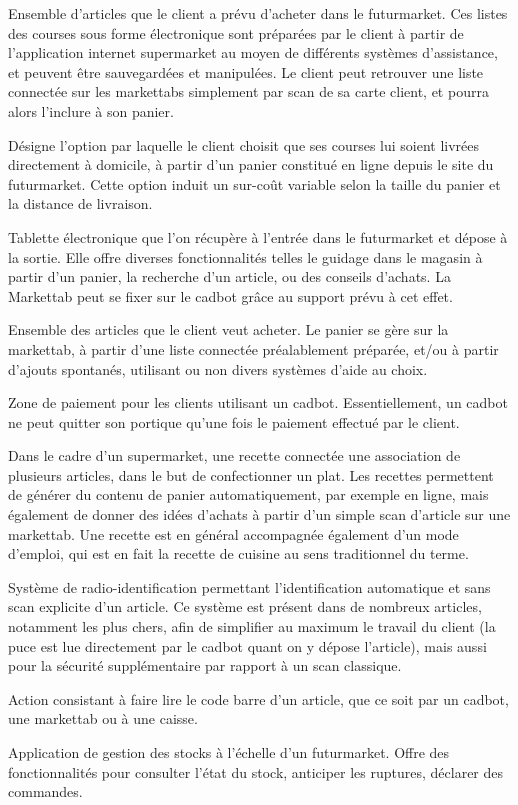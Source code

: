 Ensemble d'articles que le client a prévu d'acheter dans le futurmarket.
Ces listes des courses sous forme électronique sont préparées par le client à partir de l'application internet supermarket au moyen de différents systèmes d'assistance, et peuvent être sauvegardées et manipulées. 
Le client peut retrouver une liste connectée sur les markettabs simplement par scan de sa carte client, et pourra alors l'inclure à son panier.

Désigne l'option par laquelle le client choisit que ses courses lui soient livrées directement à domicile, à partir d'un panier constitué en ligne depuis le site du futurmarket.
Cette option induit un sur-coût variable selon la taille du panier et la distance de livraison.

Tablette électronique que l'on récupère à l'entrée dans le futurmarket et dépose à la sortie.
Elle offre diverses fonctionnalités telles le guidage dans le magasin à partir d'un panier, la recherche d'un article, ou des conseils d'achats.
La Markettab peut se fixer sur le cadbot grâce au support prévu à cet effet.

Ensemble des articles que le client veut acheter.
Le panier se gère sur la markettab, à partir d'une liste connectée préalablement préparée, et/ou à partir d'ajouts spontanés, utilisant ou non divers systèmes d'aide au choix.

Zone de paiement pour les clients utilisant un cadbot.
Essentiellement, un cadbot ne peut quitter son portique qu'une fois le paiement effectué par le client.

Dans le cadre d'un supermarket, une recette connectée une association de plusieurs articles, dans le but de confectionner un plat. 
Les recettes permettent de générer du contenu de panier automatiquement, par exemple en ligne, mais également de donner des idées d'achats à partir d'un simple scan d'article sur une markettab.
Une recette est en général accompagnée également d'un mode d'emploi, qui est en fait la recette de cuisine au sens traditionnel du terme.

Système de radio-identification permettant l'identification automatique et sans scan explicite d'un article.
Ce système est présent dans de nombreux articles, notamment les plus chers, afin de simplifier au maximum le travail du client (la puce est lue directement par le cadbot quant on y dépose l'article), mais aussi pour la sécurité supplémentaire par rapport à un scan classique.

Action consistant à faire lire le code barre d'un article, que ce soit par un cadbot, une markettab ou à une caisse.

Application de gestion des stocks à l'échelle d'un futurmarket.
Offre des fonctionnalités pour consulter l'état du stock, anticiper les ruptures, déclarer des commandes.
\par %
